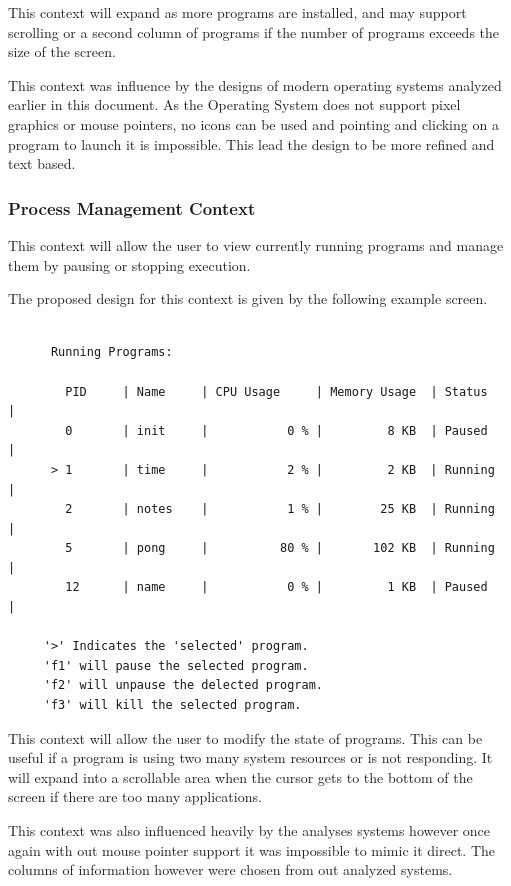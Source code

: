 \documentclass[a4paper]{report}
\begin{document}
This context will expand as more programs are installed, and may support scrolling or a second column of programs if the number of programs exceeds the size of the screen.

This context was influence by the designs of modern operating systems analyzed earlier in this document. As the Operating System does not support pixel graphics or mouse pointers, no icons can be used and pointing and clicking on a program to launch it is impossible. This lead the design to be more refined and text based.


\subsubsection*{Process Management Context}

This context will allow the user to view currently running programs and manage them by pausing or stopping execution.

The proposed design for this context is given by the following example screen.

{\ttfamily \small
  \begin{framed}
    \begin{verbatim}

      Running Programs:

        PID     | Name     | CPU Usage     | Memory Usage  | Status     |
        0       | init     |           0 % |         8 KB  | Paused     |
      > 1       | time     |           2 % |         2 KB  | Running    |
        2       | notes    |           1 % |        25 KB  | Running    |
        5       | pong     |          80 % |       102 KB  | Running    |
        12      | name     |           0 % |         1 KB  | Paused     |

     '>' Indicates the 'selected' program.
     'f1' will pause the selected program.
     'f2' will unpause the delected program.
     'f3' will kill the selected program.

    \end{verbatim}
  \end{framed}
}

This context will allow the user to modify the state of programs. This can be useful if a program is using two many system resources or is not responding. It will expand into a scrollable area when the cursor gets to the bottom of the screen if there are too many applications.

This context was also influenced heavily by the analyses systems however once again with out mouse pointer support it was impossible to mimic it direct. The columns of information however were chosen from out analyzed systems.
\end{document}
